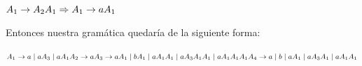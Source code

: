 \newpage

$ A_{1} \rightarrow A_{2}A_{1} \newline \Rightarrow A_{1} \rightarrow aA_{1} $ \newline

Entonces nuestra gramática quedaría de la siguiente forma: \newline

$ A_{1} \rightarrow a \; | \; aA_{3} \; | \; aA_{1} \newline A_{2} \rightarrow  a \newline A_{3} \rightarrow aA_{1} \; | \; bA_{1} \; | \; aA_{1}A_{1} \; | \; aA_{3}A_{1}A_{1} \; | \; aA_{1}A_{1}A_{1} \;  \newline A_{4} \rightarrow a \; | \; b \; | \; aA_{1} \; | \; aA_{3}A_{1} \; | \; aA_{1}A_{1} $ \newline




